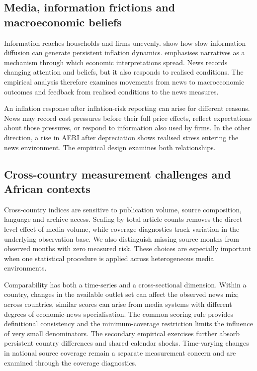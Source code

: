 \documentclass[11pt]{article}
\begin{document}
\subsection{Media, information frictions and macroeconomic beliefs}
Information reaches households and firms unevenly. \citet{mankiwreis2002} show how slow information diffusion can generate persistent inflation dynamics. \citet{shiller2017} emphasises narratives as a mechanism through which economic interpretations spread. News records changing attention and beliefs, but it also responds to realised conditions. The empirical analysis therefore examines movements from news to macroeconomic outcomes and feedback from realised conditions to the news measures.

An inflation response after inflation-risk reporting can arise for different reasons. News may record cost pressures before their full price effects, reflect expectations about those pressures, or respond to information also used by firms. In the other direction, a rise in AERI after depreciation shows realised stress entering the news environment. The empirical design examines both relationships.

\subsection{Cross-country measurement challenges and African contexts}
Cross-country indices are sensitive to publication volume, source composition, language and archive access. Scaling by total article counts removes the direct level effect of media volume, while coverage diagnostics track variation in the underlying observation base. We also distinguish missing source months from observed months with zero measured risk. These choices are especially important when one statistical procedure is applied across heterogeneous media environments.

Comparability has both a time-series and a cross-sectional dimension. Within a country, changes in the available outlet set can affect the observed news mix; across countries, similar scores can arise from media systems with different degrees of economic-news specialisation. The common scoring rule provides definitional consistency and the minimum-coverage restriction limits the influence of very small denominators. The secondary empirical exercises further absorb persistent country differences and shared calendar shocks. Time-varying changes in national source coverage remain a separate measurement concern and are examined through the coverage diagnostics.
\end{document}
